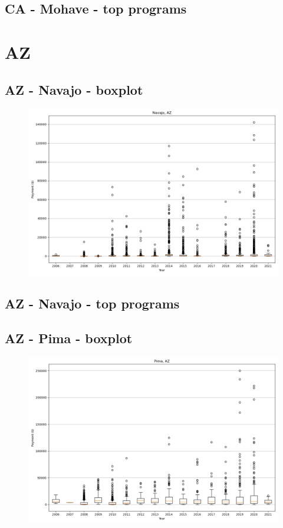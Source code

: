 \subsection*{CA - Mohave - top programs}

\newpage
\section*{AZ}
\subsection*{AZ - Navajo - boxplot}
\begin{figure}[h]
\centering
\includegraphics[width=7in]{../output/boxplots/counties/Navajo-AZ_boxplot.png}
\end{figure}


\subsection*{AZ - Navajo - top programs}

\newpage
\subsection*{AZ - Pima - boxplot}
\begin{figure}[h]
\centering
\includegraphics[width=7in]{../output/boxplots/counties/Pima-AZ_boxplot.png}
\end{figure}


